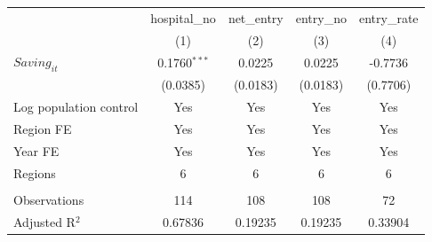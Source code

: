 \begingroup
\centering
\begin{tabular}{lcccc}
   \toprule
                          & hospital\_no   & net\_entry  & entry\_no  & entry\_rate \\    
                          & (1)            & (2)         & (3)        & (4)\\  
   \midrule 
   $Saving_{it}$          & 0.1760$^{***}$ & 0.0225      & 0.0225     & -0.7736\\   
                          & (0.0385)       & (0.0183)    & (0.0183)   & (0.7706)\\   
   Log population control & Yes            & Yes         & Yes        & Yes\\  
   Region FE              & Yes            & Yes         & Yes        & Yes\\  
   Year FE                & Yes            & Yes         & Yes        & Yes\\  
   Regions                & 6              & 6           & 6          & 6\\  
    \\
   Observations           & 114            & 108         & 108        & 72\\  
   Adjusted R$^2$         & 0.67836        & 0.19235     & 0.19235    & 0.33904\\  
   \bottomrule
\end{tabular}
\par\endgroup
